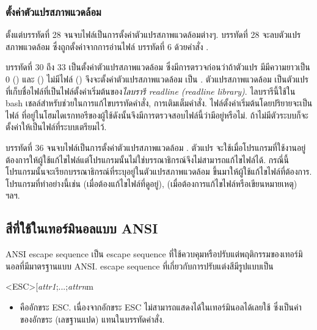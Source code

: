 \begin{thwbr}
\subsubsection{ตั้งค่าตัวแปรสภาพแวดล้อม}
ตั้งแต่บรรทัดที่ 28 จนจบไฟล์เป็นการตั้งค่าตัวแปรสภาพแวดล้อมต่างๆ. บรรทัดที่ 28 จะลบตัวแปรสภาพแวดล้อม  ซึ่งถูกตั้งค่าจากการอ่านไฟล์  บรรทัดที่ 6 ด้วยคำสั่ง . 

บรรทัดที่ 30 ถึง 33 เป็นตั้งค่าตัวแปรสภาพแวดล้อม  ซึ่งมีการตรวจก่อนว่าถ้าตัวแปร  มีมีความยาวเป็น 0 () และ () ไม่มีไฟล์  () จึงจะตั้งค่าตัวแปรสภาพแวดล้อม  เป็น . ตัวแปรสภาพแวดล้อม  เป็นตัวแปรที่เก็บชื่อไฟล์ที่เป็นไฟล์ตั้งค่าเริ่มต้นของ\emph{ไลบรารี readline (readline library)}. ไลบรารีนี้ใช้ใน bash เชลล์สำหรับช่วยในการแก้ไขบรรทัดคำสั่ง, การเติมเต็มคำสั่ง. ไฟล์ตั้งค่าเริ่มต้นโดยปริยายจะเป็นไฟล์  ที่อยู่ในโฮมไดเรกทอรีของผู้ใช้ดังนั้นจึงมีการตรวจสอบไฟล์นี้ว่ามีอยู่หรือไม่. ถ้าไม่มีตัวระบบก็จะตั้งค่าให้เป็นไฟล์ที่ระบบเตรียมไว้. 

บรรทัดที่ 36 จนจบไฟล์เป็นการตั้งค่าตัวแปรสภาพแวดล้อม . ตัวแปร  จะใช้เมื่อโปรแกรมที่ใช้งานอยู่ต้องการให้ผู้ใช้แก้ไขไฟล์แต่โปรแกรมนั้นไม่ใช่บรรณาธิกรณ์จึงไม่สามารถแก้ไขไฟล์ได้. กรณี่นี้โปรแกรมนั้นจะเรียกบรรณาธิกรณ์ที่ระบุอยู่ในตัวแปรสภาพแวดล้อม  ขึ้นมาให้ผู้ใช้แก้ไขไฟล์ที่ต้องการ. โปรแกรมที่ทำอย่างนี้เช่น  (เมื่อต้องแก้ไขไฟล์ที่ดูอยู่),  (เมื่อต้องการแก้ไขไฟล์หรือเขียนหมายเหตุ) ฯลฯ. 


\subsection{สีที่ใช้ในเทอร์มินอลแบบ ANSI}
ANSI escape sequence เป็น escape sequence ที่ใช้ควบคุมหรือปรับแต่พฤติกรรมของเทอร์มินอลที่มีมาตรฐานแบบ ANSI. escape sequence ที่เกี่ยวกับการปรับแต่งสีมีรูปแบบเป็น
\begin{MyVerbatim}
<ESC>[{\textit{attr1}};...;{\textit{attrn}}m
\end{MyVerbatim}
\begin{itemize}
\item {} คืออักขระ ESC. เนื่องจากอักขระ ESC ไม่สามารถแสดงได้ในเทอร์มินอลได้เลยใช้  ซึ่งเป็นค่าของอักขระ (เลขฐานแปด) แทนในบรรทัดคำสั่ง.


\end{itemize}
\end{thwbr}

